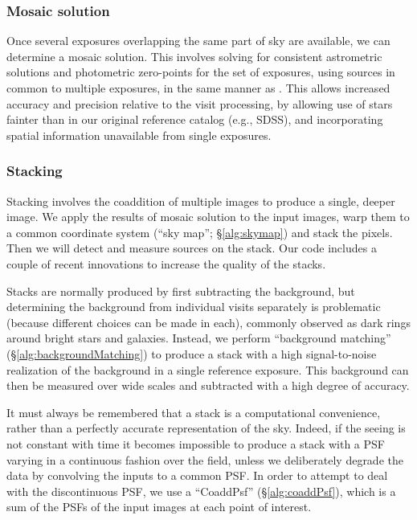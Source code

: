 \documentclass[12pt]{article}
\begin{document}
\subsubsection{Mosaic solution}

Once several exposures overlapping the same part of sky are available, we can determine a mosaic solution.
This involves solving for consistent astrometric solutions and photometric zero-points for the set of
exposures, using sources in common to multiple exposures, in the same manner as \citet{2008ApJ...674.1217P}.
This allows increased accuracy and precision relative to the visit processing, by allowing use of stars
fainter than in our original reference catalog (e.g., SDSS), and incorporating spatial information unavailable
from single exposures.


\subsubsection{Stacking}
\label{flow:stack}

Stacking involves the coaddition of multiple images to produce a single, deeper image.  We apply the results
of mosaic solution to the input images, warp them to a common coordinate system (``sky map'';
\S\ref{alg:skymap}) and stack the pixels.  Then we will detect and measure sources on the stack.  Our code
includes a couple of recent innovations to increase the quality of the stacks.

Stacks are normally produced by first subtracting the background, but determining the background from
individual visits separately is problematic (because different choices can be made in each), commonly observed
as dark rings around bright stars and galaxies.  Instead, we perform ``background matching''
(\S\ref{alg:backgroundMatching}) to produce a stack with a high signal-to-noise realization of the background
in a single reference exposure.  This background can then be measured over wide scales and subtracted with a
high degree of accuracy.

It must always be remembered that a stack is a computational convenience, rather than a perfectly accurate
representation of the sky.  Indeed, if the seeing is not constant with time it becomes impossible to produce a
stack with a PSF varying in a continuous fashion over the field, unless we deliberately degrade the data by
convolving the inputs to a common PSF.  In order to attempt to deal with the discontinuous PSF, we use a
``CoaddPsf'' (\S\ref{alg:coaddPsf}), which is a sum of the PSFs of the input images at each point of interest.
\end{document}
